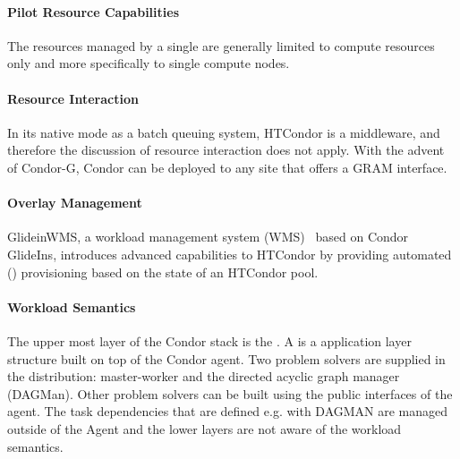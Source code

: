 \documentclass{sig-alternate}
\begin{document}
\paragraph{Pilot Resource Capabilities}

The resources managed by a single \pilot are generally limited to compute
resources only and more specifically to single compute nodes.

\paragraph{Resource Interaction}

In its native mode as a batch queuing system, HTCondor is a middleware, and
therefore the discussion of resource interaction does not apply. With the
advent of Condor-G, Condor can be deployed to any site that offers a GRAM
interface.

\paragraph{Overlay Management}


GlideinWMS, a workload management system (WMS)~\cite{1742-6596-119-6-062044}
based on Condor GlideIns, introduces advanced \pilot capabilities to HTCondor
by providing automated \pilot () provisioning based on the
state of an HTCondor pool.

\paragraph{Workload Semantics}

The upper most layer of the Condor stack is the .
A  is a application layer structure built on top of the
Condor agent. Two problem solvers are supplied in the distribution:
master-worker and the directed acyclic graph manager (DAGMan).
Other problem solvers can be built using the public interfaces of the agent.
The task dependencies that are defined e.g. with DAGMAN are managed outside of
the Agent and the lower layers are not aware of the workload semantics.
\end{document}
